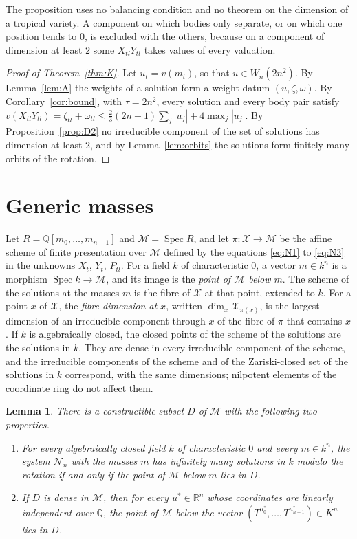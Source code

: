 \documentclass[11pt]{amsart}
\newtheorem{lemma}[theorem]{Lemma}
\theoremstyle{definition}
\theoremstyle{remark}
\numberwithin{equation}{section}
\newcommand{\QQ}{\mathbb{Q}}
\newcommand{\RR}{\mathbb{R}}
\newcommand{\cN}{\mathcal{N}}
\newcommand{\cX}{\mathcal{X}}
\newcommand{\cM}{\mathcal{M}}
\DeclareMathOperator{\Spec}{Spec}
\begin{document}
The proposition uses no balancing condition and no theorem on the dimension of a tropical variety. A
component on which bodies only separate, or on which one position tends to $0$, is excluded with the
others, because on a component of dimension at least $2$ some $X_{tl} Y_{tl}$ takes values of every valuation.

\begin{proof}[Proof of Theorem~\ref{thm:K}]
Let $u_t = v(m_t)$, so that $u \in W_n(2n^2)$. By Lemma~\ref{lem:A} the weights of a solution form a
weight datum $(u, \zeta, \omega)$. By Corollary~\ref{cor:bound}, with $\tau = 2n^2$, every solution and
every body pair satisfy
$v(X_{tl} Y_{tl}) = \zeta_{tl} + \omega_{tl} \le \tfrac23 (2n - 1) \sum_j |u_j| + 4 \max_j |u_j|$. By
Proposition~\ref{prop:D2} no irreducible component of the set of solutions has dimension at least $2$,
and by Lemma~\ref{lem:orbits} the solutions form finitely many orbits of the rotation.
\end{proof}

\section{Generic masses}\label{sec:generic}

Let $R = \QQ[m_0, \dots, m_{n-1}]$ and $\cM = \Spec R$, and let $\pi \colon \cX \to \cM$ be the affine
scheme of finite presentation over $\cM$ defined by the equations \eqref{eq:N1} to \eqref{eq:N3} in the
unknowns $X_t$, $Y_t$, $P_{tl}$. For a field $k$ of characteristic $0$, a vector $m \in k^n$ is a
morphism $\Spec k \to \cM$, and its image is the \emph{point of $\cM$ below $m$}. The scheme of the
solutions at the masses $m$ is the fibre of $\cX$ at that point, extended to $k$. For a point $x$ of
$\cX$, the \emph{fibre dimension at $x$}, written $\dim_x \cX_{\pi(x)}$, is the largest dimension of an
irreducible component through $x$ of the fibre of $\pi$ that contains $x$. If $k$ is algebraically
closed, the closed points of the scheme of the solutions are the solutions in $k$. They are dense in
every irreducible component of the scheme, and the irreducible components of the scheme and of the
Zariski-closed set of the solutions in $k$ correspond, with the same dimensions; nilpotent elements of
the coordinate ring do not affect them.

\begin{lemma}\label{lem:D0}
There is a constructible subset $D$ of $\cM$ with the following two properties.
\begin{enumerate}
\item[(a)] For every algebraically closed field $k$ of characteristic $0$ and every $m \in k^n$, the
system $\cN_n$ with the masses $m$ has infinitely many solutions in $k$ modulo the rotation if and only
if the point of $\cM$ below $m$ lies in $D$.
\item[(b)] If $D$ is dense in $\cM$, then for every $u^{*} \in \RR^n$ whose coordinates are linearly
independent over $\QQ$, the point of $\cM$ below the vector
$(T^{u^{*}_0}, \dots, T^{u^{*}_{n-1}}) \in K^n$ lies in $D$.
\end{enumerate}
\end{lemma}
\end{document}
